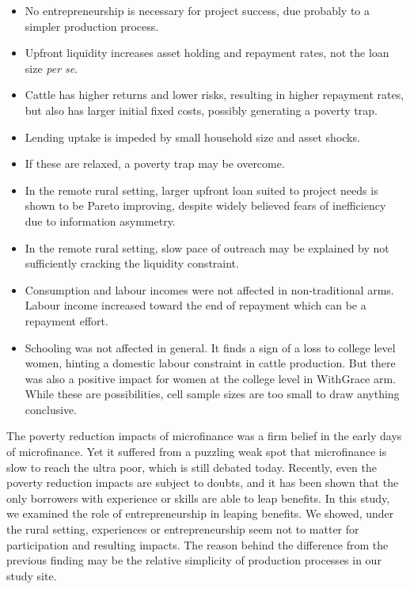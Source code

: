 \begin{mdframed}[style={SecItemize}, frametitle={Conclusion}]
\begin{itemize}
\vspace{1.0ex}\setlength{\itemsep}{1.0ex}\setlength{\baselineskip}{12pt}
\item	No entrepreneurship is necessary for project success, due probably to a simpler production process.
\item	Upfront liquidity increases asset holding and repayment rates, not the loan size \textit{per se}.
\item	Cattle has higher returns and lower risks, resulting in higher repayment rates, but also has larger initial fixed costs, possibly generating a poverty trap.
\item	Lending uptake is impeded by small household size and asset shocks.
\item	If these are relaxed, a poverty trap may be overcome.
\item	In the remote rural setting, larger upfront loan suited to project needs is shown to be Pareto improving, despite widely believed fears of inefficiency due to information asymmetry.
\item	In the remote rural setting, slow pace of outreach may be explained by not sufficiently cracking the liquidity constraint.
\item	Consumption and labour incomes were not affected in non-\textsf{traditional} arms. Labour income increased toward the end of repayment which can be a repayment effort.
\item	Schooling was not affected in general. It finds a sign of a loss to college level women, hinting a domestic labour constraint in cattle production. But there was also a positive impact for women at the college level in \textsf{WithGrace} arm. While these are possibilities, cell sample sizes are too small to draw anything conclusive.
\end{itemize}
\end{mdframed}

		The poverty reduction impacts of microfinance was a firm belief in the early days of microfinance. Yet it suffered from a puzzling weak spot that microfinance is slow to reach the ultra poor, which is still debated today. Recently, even the poverty reduction impacts are subject to doubts, and it has been shown that the only borrowers with experience or skills are able to leap benefits. In this study, we examined the role of entrepreneurship in leaping benefits. We showed, under the rural setting, experiences or entrepreneurship seem not to matter for participation and resulting impacts. The reason behind the difference from the previous finding may be the relative simplicity of production processes in our study site. 
		
